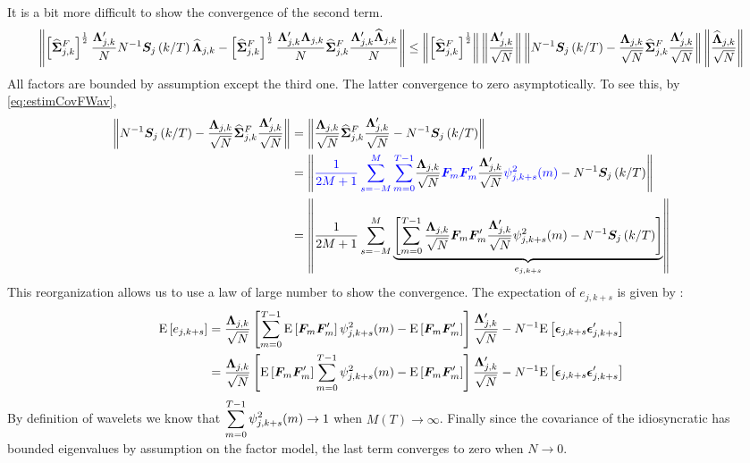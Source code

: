 \documentclass[main_document.tex]{subfiles}
\begin{document}
It is a bit more difficult to show the convergence of the second term. 
\begin{align*}
	\left\lVert \left[\widehat{\bm{\Sigma}}_{j,k}^{F}\right]^{\frac{1}{2}} \frac{\bm{\Lambda}_{j,k}'}{N} N^{-1} \bm{S}_{j}\left(k/T\right) \widehat{\bm{\Lambda}}_{j,k} - \left[\widehat{\bm{\Sigma}}_{j,k}^{F}\right]^{\frac{1}{2}} \frac{\bm{\Lambda}_{j,k}'\bm{\Lambda}_{j,k}}{N}\widehat{\bm{\Sigma}}_{j,k}^{F}\frac{\bm{\Lambda}_{j,k}'\widehat{\bm{\Lambda}}_{j,k}}{N}\right\rVert 
\leq \left\lVert\left[\widehat{\bm{\Sigma}}_{j,k}^{F}\right]^{\frac{1}{2}}\right\rVert \left\lVert\frac{\bm{\Lambda}_{j,k}'}{\sqrt{N}}\right\rVert \left\lVert N^{-1}\bm{S}_{j}\left(k/T\right) - \frac{\bm{\Lambda}_{j,k}}{\sqrt{N}} \widehat{\bm{\Sigma}}_{j,k}^{F} \frac{\bm{\Lambda}_{j,k}'}{\sqrt{N}}\right\rVert \left\lVert\frac{\widehat{\bm{\Lambda}}_{j,k}}{\sqrt{N}}\right\rVert
\end{align*}
All factors are bounded by assumption except the third one. The latter convergence to zero asymptotically. To see this, by \eqref{eq:estimCovFWav},
\begin{align*}
	\norm{N^{-1}\CEWS{j}{k} - \frac{\loadings{j}{k}}{\sqrt{N}} \estimCovFactorWav{j}{k} \frac{\loadings{j}{k}'}{\sqrt{N}}} 
&= \norm{\frac{\loadings{j}{k}}{\sqrt{N}} \estimCovFactorWav{j}{k} \frac{\loadings{j}{k}'}{\sqrt{N}} - N^{-1}\CEWS{j}{k}}\\
&= \norm{ \textcolor{blue}{\frac{\displaystyle 1}{\displaystyle 2M+1} \smoothsum{s} \locsum{m}} \frac{\loadings{j}{k}}{\sqrt{N}} \textcolor{blue}{\factors{m}\factors{m}'} \frac{\loadings{j}{k}'}{\sqrt{N}} \textcolor{blue}{\squaredWavelet{j}{k+s}{m}} - N^{-1}\CEWS{j}{k}} \\
&= \norm{ \frac{\displaystyle 1}{\displaystyle 2M+1} \smoothsum{s} \underbrace{\left[ \locsum{m} \frac{\loadings{j}{k}}{\sqrt{N}} \factors{m}\factors{m}' \frac{\loadings{j}{k}'}{\sqrt{N}} \squaredWavelet{j}{k+s}{m} - N^{-1}\CEWS{j}{k} \right]}_{e_{j,k+s}}}
\end{align*}
This reorganization allows us to use a law of large number to show the convergence. The expectation of $e_{j,k+s}$ is given by :
\begin{align*}
	\E{e_{j,k+s}} &= \frac{\loadings{j}{k}}{\sqrt{N}} \left[ \locsum{m} \E{\factors{m}\factors{m}'} \squaredWavelet{j}{k+s}{m} - \E{\factors{m}\factors{m}'} \right] \frac{\loadings{j}{k}'}{\sqrt{N}} - N^{-1}\E{\idioError{j}{k+s}\idioError{j}{k+s}'}\\
	&= \frac{\loadings{j}{k}}{\sqrt{N}} \left[\E{\factors{m}\factors{m}'} \locsum{m} \squaredWavelet{j}{k+s}{m} - \E{\factors{m}\factors{m}'} \right] \frac{\loadings{j}{k}'}{\sqrt{N}} - N^{-1}\E{\idioError{j}{k+s}\idioError{j}{k+s}'}
\end{align*}
By definition of wavelets we know that $\locsum{m} \squaredWavelet{j}{k+s}{m} \to 1$ when $M(T) \to \infty$. Finally since the covariance of the idiosyncratic has bounded eigenvalues by assumption on the factor model, the last term converges to zero when $N \to 0$. 

\end{document}
